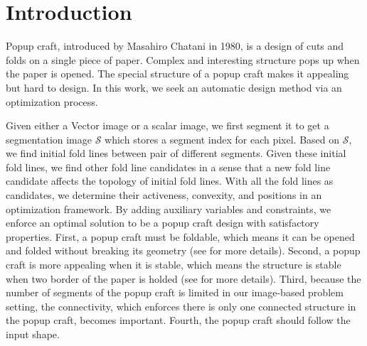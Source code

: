 \section{Introduction} \label{introduction}
Popup craft, introduced by Masahiro Chatani in 1980, is a design of cuts and folds on a single piece of paper. Complex and interesting structure pops up when the paper is opened. The special structure of a popup craft makes it appealing but hard to design. In this work, we seek an automatic design method via an optimization process. 

Given either a Vector image or a scalar image, we first segment it to get a segmentation image $\mathcal{S}$ which stores a segment index for each pixel. Based on $\mathcal{S}$, we find initial fold lines between pair of different segments. Given these initial fold lines, we find other fold line candidates in a sense that a new fold line candidate affects the topology of initial fold lines. With all the fold lines as candidates, we determine their activeness, convexity, and positions in an optimization framework. By adding auxiliary variables and constraints, we enforce an optimal solution to be a popup craft design with satisfactory properties. First, a popup craft must be foldable, which means it can be opened and folded without breaking its geometry (see \cite{li2010popup} for more details). Second, a popup craft is more appealing when it is stable, which means the structure is stable when two border of the paper is holded (see \cite{li2010popup} for more details). Third, because the number of segments of the popup craft is limited in our image-based problem setting, the connectivity, which enforces there is only one connected structure in the popup craft, becomes important. Fourth, the popup craft should follow the input shape.